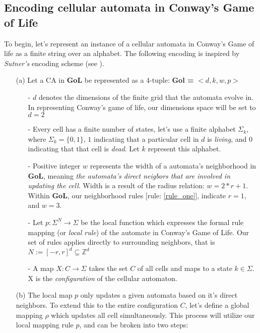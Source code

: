 \documentclass{article}
\theoremstyle{definition}
\theoremstyle{plain}
\theoremstyle{plain}
\begin{document}
\subsection{Encoding cellular automata in Conway's Game of Life}
To begin, let's represent an instance of a cellular automata in Conway's Game of life as a finite string over an alphabet. The following encoding is inspired by \textit{Sutner's} encoding scheme (see \cite{SUTNER199587}).
\begin{enumerate}
  \item[(a)] Let a CA in \textbf{GoL} be represented as a 4-tuple: \textbf{Gol = } $ <d, k, w, p> $
    \begin{enumerate}
      \item[-] $d$ denotes the dimensions of the finite grid that the automata evolve in. In representing Conway's game of life, our dimensions space will be set to $d = 2$
      \item[-] Every cell has a finite number of states, let's use a finite alphabet $\Sigma_k$, where $\Sigma_k = \{0,1\}$, $1$ indicating that a particular cell in $d$ is \textit{living}, and $0$ indicating that that cell is \textit{dead}. Let $k$ represent this alphabet.
      \item[-] Positive integer $w$ represents the width of a automata's neighborhood in \textbf{GoL}, meaning \textit{the automata's direct neigbors that are involved in updating the cell}. Width is a result of the radius relation: $w = 2*r +1$. Within \textbf{GoL}, our neighborhood rules [rule: \ref{rule_one}], indicate $r = 1$, and $w = 3$.
      \item[-] Let $p : \Sigma^N \to \Sigma$ be the local function which expresses the formal rule mapping (or \textit{local rule}) of the automate in Conway's Game of Life. Our set of rules applies directly to surrounding neighbors, that is$ N := [-r, r]^d \subseteq \mathbb{Z}^d $ 
      \item[-] A map $ X : C \to \Sigma $ takes the set $ C $ of all cells and maps to a state $ k \in \Sigma$. X is the \emph{configuration} of the cellular automaton.
    \end{enumerate}
      \item[(b)] The local map $p$ only updates a given automata based on it's direct neighbors. To extend this to the entire configuration $C$, let's define a global mapping $\rho$ which updates all cell simultaneously. This process will utilize our local mapping rule $p$, and  can be broken into two steps: 
        \begin{enumerate}

\end{enumerate}
\end{enumerate}
\end{document}
